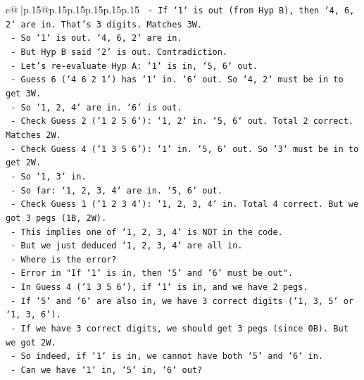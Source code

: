 \documentclass{article}
\begin{document}
{\begin{supertabular}{c@{$\;$}|p{.15\linewidth}@{}p{.15\linewidth}p{.15\linewidth}p{.15\linewidth}p{.15\linewidth}p{.15\linewidth}}
{{{\texttt{                    {-} If `1` is out (from Hyp B), then `4, 6, 2` are in. That's 3 digits. Matches 3W.} \\
\texttt{                    {-} So `1` is out. `4, 6, 2` are in.} \\
\texttt{                    {-} But Hyp B said `2` is out. Contradiction.} \\
\texttt{                {-} Let's re{-}evaluate Hyp A: `1` is in, `5, 6` out.} \\
\texttt{                    {-} Guess 6 (`4 6 2 1`) has `1` in. `6` out. So `4, 2` must be in to get 3W.} \\
\texttt{                    {-} So `1, 2, 4` are in. `6` is out.} \\
\texttt{                    {-} Check Guess 2 (`1 2 5 6`): `1, 2` in. `5, 6` out. Total 2 correct. Matches 2W.} \\
\texttt{                    {-} Check Guess 4 (`1 3 5 6`): `1` in. `5, 6` out. So `3` must be in to get 2W.} \\
\texttt{                    {-} So `1, 3` in.} \\
\texttt{                    {-} So far: `1, 2, 3, 4` are in. `5, 6` out.} \\
\texttt{                    {-} Check Guess 1 (`1 2 3 4`): `1, 2, 3, 4` in. Total 4 correct. But we got 3 pegs (1B, 2W).} \\
\texttt{                    {-} This implies one of `1, 2, 3, 4` is NOT in the code.} \\
\texttt{                    {-} But we just deduced `1, 2, 3, 4` are all in.} \\
\texttt{                    {-} Where is the error?} \\
\texttt{                    {-} Error in "If `1` is in, then `5` and `6` must be out".} \\
\texttt{                    {-} In Guess 4 (`1 3 5 6`), if `1` is in, and we have 2 pegs.} \\
\texttt{                    {-} If `5` and `6` are also in, we have 3 correct digits (`1, 3, 5` or `1, 3, 6`).} \\
\texttt{                    {-} If we have 3 correct digits, we should get 3 pegs (since 0B). But we got 2W.} \\
\texttt{                    {-} So indeed, if `1` is in, we cannot have both `5` and `6` in.} \\
\texttt{                    {-} Can we have `1` in, `5` in, `6` out?} \\
}}}
\end{supertabular}}
\end{document}
